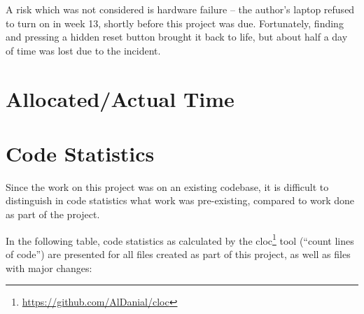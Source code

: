 A risk which was not considered is hardware failure -- the author's laptop
refused to turn on in week 13, shortly before this project was due. Fortunately,
finding and pressing a hidden reset button brought it back to life, but about
half a day of time was lost due to the incident.

\section{Allocated/Actual Time}
\fixme{}

\section{Code Statistics}
Since the work on this project was on an existing codebase, it is difficult to
distinguish in code statistics what work was pre-existing, compared to work done
as part of the project.

In the following table, code statistics as calculated by the
cloc\footnote{\url{https://github.com/AlDanial/cloc}} tool (``count lines of
code'') are presented for all files created as part of this project, as well as
files with major changes:

